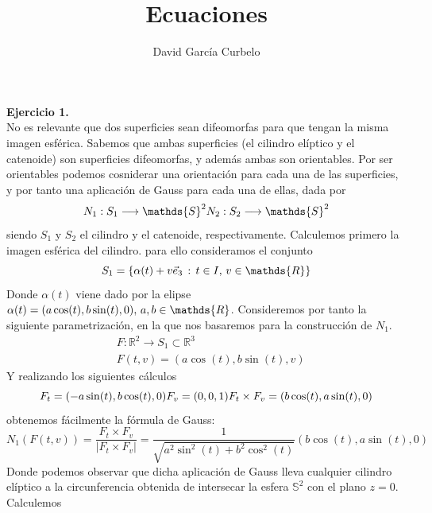 \documentclass[fleqn]{article}
\author{David García Curbelo}
\title{Ecuaciones}
\def\R{\mathds{R}}
\begin{document}
    \maketitle
    \setcounter{page}{1}
    \pagestyle{plain}

    \textbf{Ejercicio 1. } \\

    No es relevante que dos superficies sean difeomorfas para que tengan la misma imagen esférica. Sabemos que ambas superficies (el cilindro elíptico y el catenoide) 
    son superficies difeomorfas, y además ambas son orientables. Por ser orientables podemos cosniderar una orientación para cada una de las superficies, y por tanto una aplicación 
    de Gauss para cada una de ellas, dada por 
    \begin{equation*}
        N_1: S_1 \longrightarrow \mathds{S}^2\\
        N_2: S_2 \longrightarrow \mathds{S}^2
    \end{equation*}
    siendo $S_1$ y $S_2$ el cilindro y el catenoide, respectivamente. Calculemos primero la imagen esférica del cilindro. para ello consideramos el conjunto
    $$S_1 = \{\alpha(t) + v\vec{e}_3 \thinspace : \thinspace t\in I, \thinspace v\in \R\}$$
    Donde $\alpha(t)$ viene dado por la elipse $\alpha(t) = (a\cos(t), b\sin(t), 0), \thinspace a,b\in \R$. Consideremos por tanto la siguiente parametrización, en la que nos basaremos para 
    la construcción de $N_1$.
    \begin{equation*}
        \begin{aligned}
            & F:\R^2 \rightarrow S_1 \subset \R^3 \\
            &F(t,v) = (a\cos(t), b\sin(t), v)
        \end{aligned}
    \end{equation*}
    Y realizando los siguientes cálculos
    \begin{equation*}
        F_t = (-a\sin(t), b\cos(t), 0) \\
        F_v = (0,0,1) \\
        F_t \times F_v = (b\cos(t), a\sin(t), 0)
    \end{equation*}
    obtenemos fácilmente la fórmula de Gauss:
    $$N_1(F(t,v)) = \frac{F_t \times F_v}{\left|F_t \times F_v\right|} = \frac{1}{\sqrt{a^2\sin^2(t) + b^2\cos^2(t)}} (b\cos(t), a\sin(t), 0)$$
    Donde podemos observar que dicha aplicación de Gauss lleva cualquier cilindro elíptico a la circunferencia obtenida de intersecar la esfera $\mathds{S}^2$ con el plano $z=0$. Calculemos
\end{document}
